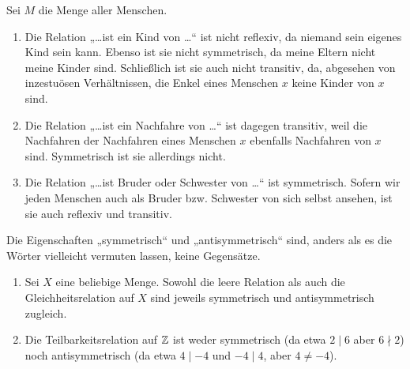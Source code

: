 \begin{bsp}[Verwandtschaftsgrade]
    Sei $M$ die Menge aller Menschen.
    \begin{enumerate}
        \item Die Relation „\dots ist ein Kind von \dots“ ist nicht reflexiv, da niemand sein eigenes Kind sein kann. Ebenso ist sie nicht symmetrisch, da meine Eltern nicht meine Kinder sind. Schließlich ist sie auch nicht transitiv, da, abgesehen von inzestuösen Verhältnissen, die Enkel eines Menschen $x$ keine Kinder von $x$ sind.
        \item Die Relation „\dots ist ein Nachfahre von \dots“ ist dagegen transitiv, weil die Nachfahren der Nachfahren eines Menschen $x$ ebenfalls Nachfahren von $x$ sind. Symmetrisch ist sie allerdings nicht.
        \item Die Relation „\dots ist Bruder oder Schwester von \dots“ ist symmetrisch. Sofern wir jeden Menschen auch als Bruder bzw. Schwester von sich selbst ansehen, ist sie auch reflexiv und transitiv.
    \end{enumerate}
\end{bsp}


\begin{bsp}
    Die Eigenschaften „symmetrisch“ und „antisymmetrisch“ sind, anders als es die Wörter vielleicht vermuten lassen, keine Gegensätze.
    \begin{enumerate}
        \item Sei $X$ eine beliebige Menge. Sowohl die leere Relation als auch die Gleichheitsrelation auf $X$ sind jeweils symmetrisch und antisymmetrisch zugleich.
        \item Die Teilbarkeitsrelation auf $\mathbb Z$ ist weder symmetrisch (da etwa $2\mid 6$ aber $6\nmid 2$) noch antisymmetrisch (da etwa $4\mid -4$ und $-4\mid 4$, aber $4\neq -4$).
    \end{enumerate}
\end{bsp}


